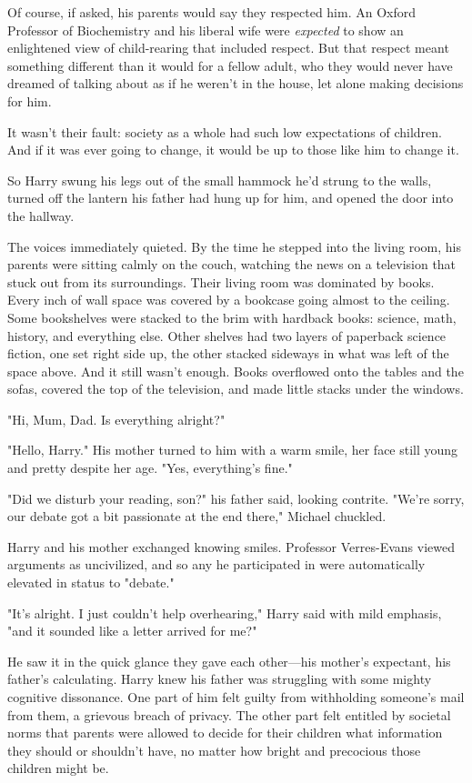 Of course, if asked, his parents would say they respected
him. An Oxford Professor of Biochemistry and his liberal
wife were \emph{expected} to show an enlightened view of
child-rearing that included respect. But that respect meant
something different than it would for a fellow adult, who
they would never have dreamed of talking about as if he
weren't in the house, let alone making decisions for him.

It wasn't their fault: society as a whole had such low
expectations of children. And if it was ever going to
change, it would be up to those like him to change it.

So Harry swung his legs out of the small hammock he'd
strung to the walls, turned off the lantern his father had
hung up for him, and opened the door into the hallway.

The voices immediately quieted. By the time he stepped
into the living room, his parents were sitting calmly on the
couch, watching the news on a television that stuck out
from its surroundings. Their living room was
dominated by books. Every inch of wall space was covered
by a bookcase going almost to the ceiling. Some
bookshelves were stacked to the brim with hardback
books: science, math, history, and everything else. Other
shelves had two layers of paperback science fiction, one
set right side up, the other stacked sideways in what was left
of the space above. And it still wasn't enough. Books 
overflowed onto the tables and the sofas, covered the top
of the television, and made little stacks under the windows.

"Hi, Mum, Dad. Is everything alright?"

"Hello, Harry." His mother turned to him with a warm
smile, her face still young and pretty despite her age. "Yes,
everything's fine."

"Did we disturb your reading, son?" his father said, looking
contrite. "We're sorry, our debate got a bit passionate at
the end there," Michael chuckled.

Harry and his mother exchanged knowing smiles. Professor
Verres-Evans viewed arguments as uncivilized, and so any
he participated in were automatically elevated in status to
"debate."

"It's alright. I just couldn't help overhearing,"
Harry said with mild emphasis, "and it sounded like a letter
arrived for me?"

He saw it in the quick glance they gave each other—his
mother's expectant, his father's calculating. Harry knew his
father was struggling with some mighty cognitive
dissonance. One part of him felt guilty from withholding
someone's mail from them, a grievous breach of privacy.
The other part felt entitled by societal norms that parents
were allowed to decide for their children what information
they should or shouldn't have, no matter how bright and
precocious those children might be.

